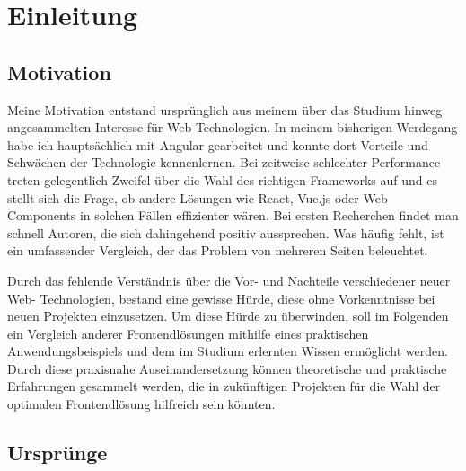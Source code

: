 \documentclass[oneside]{ausarbeitung}
\begin{document}
\cleardoublepage
{}
\setcounter{page}{1}

\chapter{Einleitung}
\label{cha:einleitung}

\section{Motivation}
\label{sec:motivation}

Meine Motivation entstand ursprünglich aus meinem über das Studium hinweg angesammelten Interesse für Web-Technologien. In meinem bisherigen Werdegang habe ich hauptsächlich mit Angular gearbeitet und konnte dort Vorteile und Schwächen der Technologie kennenlernen. Bei zeitweise schlechter Performance treten gelegentlich Zweifel über die Wahl des richtigen Frameworks auf und es stellt sich die Frage, ob andere Lösungen wie React, Vue.js oder Web Components in solchen Fällen effizienter wären. Bei ersten Recherchen findet man schnell Autoren, die sich dahingehend positiv aussprechen. Was häufig fehlt, ist ein umfassender Vergleich, der das Problem von mehreren Seiten beleuchtet.

Durch das fehlende Verständnis über die Vor- und Nachteile verschiedener neuer Web- Technologien, bestand eine gewisse Hürde, diese ohne Vorkenntnisse bei neuen Projekten einzusetzen. Um diese Hürde zu überwinden, soll im Folgenden ein Vergleich anderer Frontendlösungen mithilfe eines praktischen Anwendungsbeispiels und dem im Studium erlernten Wissen ermöglicht werden. Durch diese praxisnahe Auseinandersetzung können theoretische und praktische Erfahrungen gesammelt werden, die in zukünftigen Projekten für die Wahl der optimalen Frontendlösung hilfreich sein könnten.

\section{Ursprünge}
\label{sec:ursprünge}
\end{document}
